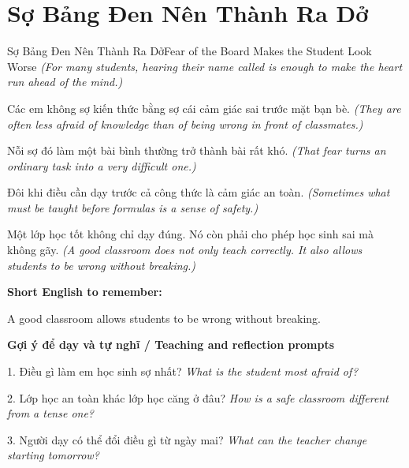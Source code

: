 \section{Sợ Bảng Đen Nên Thành Ra Dở}
\begin{truyen}{Sợ Bảng Đen Nên Thành Ra Dở}{Fear of the Board Makes the Student Look Worse}
\textit{(For many students, hearing their name called is enough to make the heart run ahead of the mind.)}

Các em không sợ kiến thức bằng sợ cái cảm giác sai trước mặt bạn bè.
\textit{(They are often less afraid of knowledge than of being wrong in front of classmates.)}

Nỗi sợ đó làm một bài bình thường trở thành bài rất khó.
\textit{(That fear turns an ordinary task into a very difficult one.)}

Đôi khi điều cần dạy trước cả công thức là cảm giác an toàn.
\textit{(Sometimes what must be taught before formulas is a sense of safety.)}

\end{truyen}

\begin{baihoc}
Một lớp học tốt không chỉ dạy đúng. Nó còn phải cho phép học sinh sai mà không gãy.
\textit{(A good classroom does not only teach correctly. It also allows students to be wrong without breaking.)}
\end{baihoc}

\begin{ghinhoanh}
\textbf{Short English to remember:}

A good classroom allows students to be wrong without breaking.

\end{ghinhoanh}

\begin{tuhocnhanh}
\textbf{Gợi ý để dạy và tự nghĩ / Teaching and reflection prompts}

1. Điều gì làm em học sinh sợ nhất? \textit{What is the student most afraid of?}

2. Lớp học an toàn khác lớp học căng ở đâu? \textit{How is a safe classroom different from a tense one?}

3. Người dạy có thể đổi điều gì từ ngày mai? \textit{What can the teacher change starting tomorrow?}
\end{tuhocnhanh}
\ngancach

